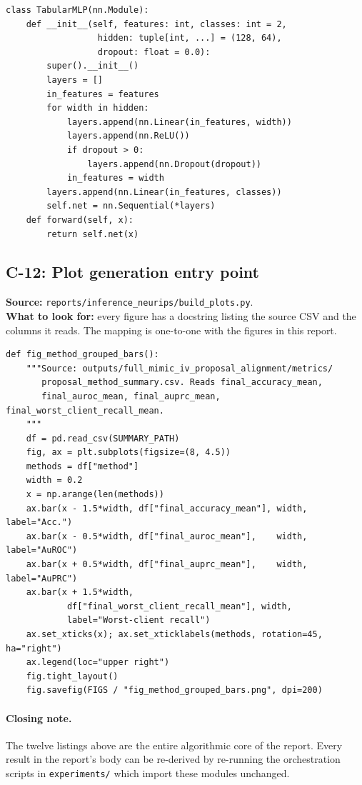 \begin{lstlisting}
class TabularMLP(nn.Module):
    def __init__(self, features: int, classes: int = 2,
                  hidden: tuple[int, ...] = (128, 64),
                  dropout: float = 0.0):
        super().__init__()
        layers = []
        in_features = features
        for width in hidden:
            layers.append(nn.Linear(in_features, width))
            layers.append(nn.ReLU())
            if dropout > 0:
                layers.append(nn.Dropout(dropout))
            in_features = width
        layers.append(nn.Linear(in_features, classes))
        self.net = nn.Sequential(*layers)
    def forward(self, x):
        return self.net(x)
\end{lstlisting}

\subsection{C-12: Plot generation entry point}
\textbf{Source:} \texttt{reports/inference\_neurips/build\_plots.py}.\\
\textbf{What to look for:} every figure has a docstring listing the
source CSV and the columns it reads. The mapping is one-to-one with
the figures in this report.

\begin{lstlisting}
def fig_method_grouped_bars():
    """Source: outputs/full_mimic_iv_proposal_alignment/metrics/
       proposal_method_summary.csv. Reads final_accuracy_mean,
       final_auroc_mean, final_auprc_mean, final_worst_client_recall_mean.
    """
    df = pd.read_csv(SUMMARY_PATH)
    fig, ax = plt.subplots(figsize=(8, 4.5))
    methods = df["method"]
    width = 0.2
    x = np.arange(len(methods))
    ax.bar(x - 1.5*width, df["final_accuracy_mean"], width, label="Acc.")
    ax.bar(x - 0.5*width, df["final_auroc_mean"],    width, label="AuROC")
    ax.bar(x + 0.5*width, df["final_auprc_mean"],    width, label="AuPRC")
    ax.bar(x + 1.5*width,
            df["final_worst_client_recall_mean"], width,
            label="Worst-client recall")
    ax.set_xticks(x); ax.set_xticklabels(methods, rotation=45, ha="right")
    ax.legend(loc="upper right")
    fig.tight_layout()
    fig.savefig(FIGS / "fig_method_grouped_bars.png", dpi=200)
\end{lstlisting}

\paragraph{Closing note.}
The twelve listings above are the entire algorithmic core of the
report. Every result in the report's body can be re-derived by
re-running the orchestration scripts in \texttt{experiments/} which
import these modules unchanged.
